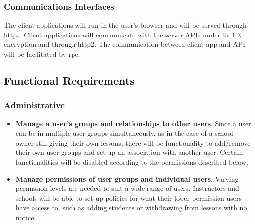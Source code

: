         \subsubsection{Communications Interfaces}\label{sec:communications-interfaces}
            The client applications will run in the user's browser and will be served through \gls{https}. Client applications will communicate with the server APIs under \gls{tls} 1.3 encryption and through \gls{http2}. The communication between client app and API will be facilitated by \gls{rpc}.
    \subsection{Functional Requirements}\label{sec:functional-requirements}
        \subsubsection{Administrative}\label{sec:administrative-functions}
            \begin{itemize}
                \item \textbf{Manage a user's groups and relationships to other users}. Since a user can be in multiple user groups simultaneously, as in the case of a school owner still giving their own lessons, there will be functionality to add/remove their own user groups and set up an association with another user. Certain functionalities will be disabled according to the permissions described below.
                \item \textbf{Manage permissions of user groups and individual users}. Varying permission levels are needed to suit a wide range of users. Instructors and schools will be able to set up policies for what their lower-permission users have access to, such as adding students or withdrawing from lessons with no notice.
            \end{itemize}
